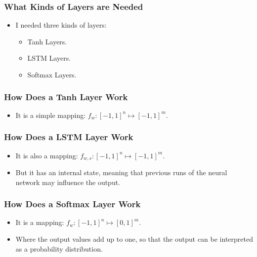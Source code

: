 \documentclass[12]{beamer}
\begin{document}
\begin{frame}
\frametitle{What Kinds of Layers are Needed}
\begin{itemize}
\item<1-> I needed three kinds of layers:
\begin{itemize}
\item<1-> Tanh Layers.
\item<1-> LSTM Layers.
\item<1-> Softmax Layers.
\end{itemize}
\end{itemize}
\end{frame}

\begin{frame}
\frametitle{How Does a Tanh Layer Work}
\begin{itemize}
\item<1-> It is a simple mapping: $f_w:\left[-1,1\right]^n\longmapsto\left[-1,1\right]^m$.
\end{itemize}
\end{frame}

\begin{frame}
\frametitle{How Does a LSTM Layer Work}
\begin{itemize}
\item<1-> It is also a mapping: $f_{w,s}:\left[-1,1\right]^n\longmapsto\left[-1,1\right]^m$.
\item<1-> But it has an internal state, meaning that previous runs of the neural network may influence the output.
\end{itemize}
\end{frame}

\begin{frame}
\frametitle{How Does a Softmax Layer Work}
\begin{itemize}
\item<1-> It is a mapping: $f_w:\left[-1,1\right]^n\longmapsto\left[0,1\right]^m$.
\item<1-> Where the output values add up to one, so that the output can be interpreted as a probability distribution.
\end{itemize}
\end{frame}
\end{document}
